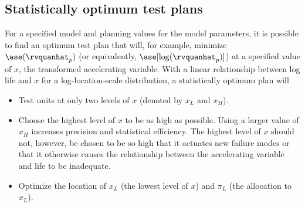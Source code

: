 \subsection{Statistically optimum test plans}
For a
specified model and planning values for the model parameters, it is
possible to find an optimum test plan that will, for example, minimize
$\ase(\rvquanhat_{p})$ (or equivalently,
$\ase[\log(\rvquanhat_{p})]$) at a specified value of $x$, the
transformed accelerating variable.
With a linear
relationship between log life and $x$ for a log-location-scale distribution, 
a statistically optimum plan will
\begin{itemize}
\item
Test units at only two levels
of $x$ (denoted by $x_{L}$ and $x_{H}$).
\item
Choose the highest level of $x$ to be as high as possible.  Using a
larger value of $x_{H}$ increases precision and statistical
efficiency.  The highest level of $x$ should not, however, be chosen
to be so high that it actuates new failure modes or that it
otherwise causes the relationship between the accelerating variable
and life to be inadequate.
\item
Optimize the location of $x_{L}$ (the lowest level of $x$) and $\pi_{L}$
(the allocation to $x_{L}$).
\end{itemize}

